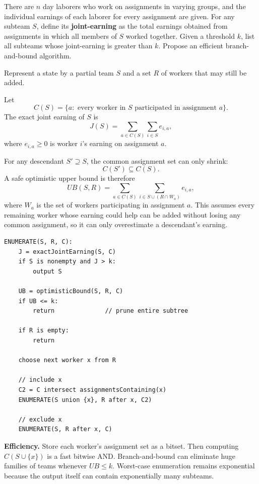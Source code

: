 \documentclass[11pt,a4paper]{article}
\begin{document}
\begin{qaquestion}
There are \(n\) day laborers who work on assignments in varying groups, and the individual earnings of each laborer for every assignment are given. For any subteam \(S\), define its \textbf{joint-earning} as the total earnings obtained from assignments in which all members of \(S\) worked together. Given a threshold \(k\), list all subteams whose joint-earning is greater than \(k\). Propose an efficient branch-and-bound algorithm.
\end{qaquestion}

\begin{qaanswer}[Answer 4(b)]
Represent a state by a partial team \(S\) and a set \(R\) of workers that may still be added.

Let
\[
C(S)=\{a:\text{ every worker in }S\text{ participated in assignment }a\}.
\]
The exact joint earning of \(S\) is
\[
J(S)=\sum_{a\in C(S)}\sum_{i\in S} e_{i,a},
\]
where \(e_{i,a}\ge0\) is worker \(i\)'s earning on assignment \(a\).

For any descendant \(S'\supseteq S\), the common assignment set can only shrink:
\[
C(S')\subseteq C(S).
\]
A safe optimistic upper bound is therefore
\[
UB(S,R)=
\sum_{a\in C(S)}
\sum_{i\in S\cup(R\cap W_a)} e_{i,a},
\]
where \(W_a\) is the set of workers participating in assignment \(a\). This assumes every remaining worker whose earning could help can be added without losing any common assignment, so it can only overestimate a descendant's earning.

\begin{lstlisting}
ENUMERATE(S, R, C):
    J = exactJointEarning(S, C)
    if S is nonempty and J > k:
        output S

    UB = optimisticBound(S, R, C)
    if UB <= k:
        return              // prune entire subtree

    if R is empty:
        return

    choose next worker x from R

    // include x
    C2 = C intersect assignmentsContaining(x)
    ENUMERATE(S union {x}, R after x, C2)

    // exclude x
    ENUMERATE(S, R after x, C)
\end{lstlisting}

\textbf{Efficiency.} Store each worker's assignment set as a bitset. Then computing \(C(S\cup\{x\})\) is a fast bitwise AND. Branch-and-bound can eliminate huge families of teams whenever \(UB\le k\). Worst-case enumeration remains exponential because the output itself can contain exponentially many subteams.
\end{qaanswer}
\end{document}
